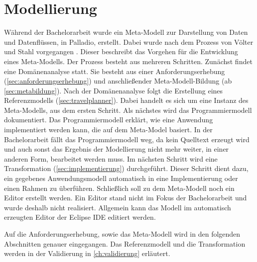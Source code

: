 
\chapter{Modellierung}
\label{ch:modellierung}

Während der Bachelorarbeit wurde ein Meta-Modell zur Darstellung von Daten und Datenflüssen, in Palladio, erstellt. Dabei wurde nach dem Prozess von Völter und Stahl vorgegangen \cite{StahlThomasVoelterMarkus2006}. Dieser beschreibt das Vorgehen für die Entwicklung eines Meta-Modells.
Der Prozess besteht aus mehreren Schritten. Zunächst findet eine Domänenanalyse statt. Sie besteht aus einer Anforderungserhebung (\autoref{sec:anforderungserhebung}) und anschließender Meta-Modell-Bildung (ab \autoref{sec:metabildung}). Nach der Domänenanalyse folgt die Erstellung eines Referenzmodells (\autoref{sec:travelplanner}). Dabei handelt es sich um eine Instanz des Meta-Modells, aus dem ersten Schritt. Als nächstes wird das Programmiermodell dokumentiert. Das Programmiermodell erklärt, wie eine Anwendung implementiert werden kann, die auf dem Meta-Model basiert. In der Bachelorarbeit fällt das Programmiermodell weg, da kein Quelltext erzeugt wird und auch sonst das Ergebnis der Modellierung nicht mehr weiter, in einer anderen Form, bearbeitet werden muss. Im nächsten Schritt wird eine Transformation (\autoref{sec:implementierung}) durchgeführt. Dieser Schritt dient dazu, ein gegebenes Anwendungsmodell automatisch in eine Implementierung oder einen Rahmen zu überführen. Schließlich soll zu dem Meta-Modell noch ein Editor erstellt werden. Ein Editor stand nicht im Fokus der Bachelorarbeit und wurde deshalb nicht realisiert. Allgemein kann das Modell im automatisch erzeugten Editor der Eclipse IDE editiert werden. \par
Auf die Anforderungserhebung, sowie das Meta-Modell wird in den folgenden Abschnitten genauer eingegangen. Das Referenzmodell und die Transformation werden in der Validierung in \autoref{ch:validierung} erläutert.


